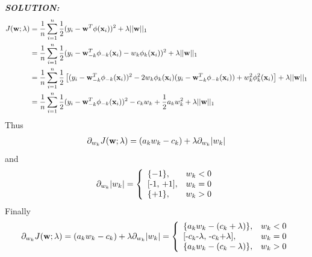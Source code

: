 \documentclass{article}
\theoremstyle{definition}
\theoremstyle{definition}
\theoremstyle{remark}
\begin{document}
\emph{\textbf{SOLUTION:}}\\
\begin{equation}\nonumber
\begin{aligned}
J(\bold{w};\lambda)&=\frac{1}{n}\sum_{i=1}^{n}\frac{1}{2}(y_{i}-\bold{w}^{T}\phi(\bold{x}_{i}))^{2}+\lambda||\bold{w}||_{1}\\
&=\frac{1}{n}\sum_{i=1}^{n}\frac{1}{2}(y_{i}-\bold{w}_{-k}^{T}\phi_{-k}(\bold{x}_{i})-w_k\phi_{k}(\bold{x}_{i}))^{2}+\lambda||\bold{w}||_{1}\\
&=\frac{1}{n}\sum_{i=1}^{n}\frac{1}{2}\left[(y_{i}-\bold{w}_{-k}^{T}\phi_{-k}(\bold{x}_{i}))^{2}-2w_k\phi_{k}(\bold{x}_{i})(y_{i}-\bold{w}_{-k}^{T}\phi_{-k}(\bold{x}_{i}))+w_k^2\phi_{k}^2(\bold{x}_{i})\right]+\lambda||\bold{w}||_{1}\\
&=\frac{1}{n}\sum_{i=1}^{n}\frac{1}{2}(y_{i}-\bold{w}_{-k}^{T}\phi_{-k}(\bold{x}_{i}))^{2}-c_kw_k+\frac{1}{2}a_kw_k^2+\lambda||\bold{w}||_{1}\\
\end{aligned}
\end{equation}
Thus
\begin{equation}\nonumber
\begin{aligned}
\partial_{w_{k}}J(\bold{w};\lambda)=(a_{k}w_{k}-c_{k})+\lambda\partial_{w_{k}}|w_{k}|
\end{aligned}
\end{equation}
and
\begin{displaymath}
\partial_{w_{k}}|w_{k}|= \left\{ \begin{array}{ll}
\{-1\}, & \textrm{$w_{k}<0$} \\
$[-1, +1]$, & \textrm{$w_{k}=0$} \\
\{+1\}, & \textrm{$w_{k}>0$}
\end{array} \right.
\end{displaymath}
Finally
\begin{displaymath}
\partial_{w_{k}}J(\bold{w};\lambda)=(a_{k}w_{k}-c_{k})+\lambda\partial_{w_{k}}|w_{k}| =\left\{ \begin{array}{ll}
\{a_{k}w_{k}-(c_{k}+\lambda)\}, & \textrm{$w_{k}<0$} \\
$[-$c_{k}$-$\lambda$, -$c_{k}$+$\lambda$]$, & \textrm{$w_{k}=0$} \\
\{a_{k}w_{k}-(c_{k}-\lambda)\}, & \textrm{$w_{k}>0$}
\end{array} \right.
\end{displaymath}
\end{document}
